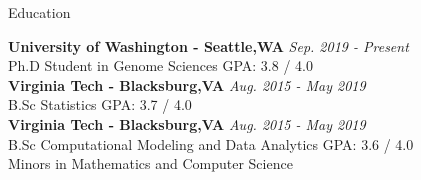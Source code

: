 \documentclass{resume} %
\begin{document}

\begin{rSection}{Education}

{\bf University of Washington - Seattle,WA} \hfill {\em Sep. 2019 - Present}
\\ Ph.D Student in Genome Sciences \hfill { GPA: 3.8 / 4.0} \smallskip \\
{\bf Virginia Tech - Blacksburg,VA} \hfill {\em Aug. 2015 - May 2019}
\\ B.Sc Statistics \hfill { GPA: 3.7 / 4.0} \smallskip
\\{\bf Virginia Tech - Blacksburg,VA} \hfill {\em Aug. 2015 - May 2019}
\\ B.Sc Computational Modeling and Data Analytics \hfill { GPA: 3.6 / 4.0 } \smallskip  \\
Minors in Mathematics and Computer Science
\end{rSection}



\end{document}

